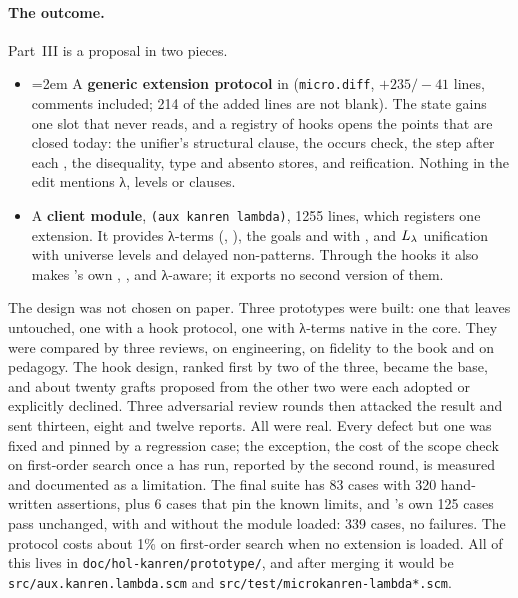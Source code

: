 \paragraph{The outcome.} Part~III is a proposal in two pieces.
\begin{itemize}[nosep]
  \item \emergencystretch=2em A \textbf{generic extension protocol} in \micro{} (\texttt{micro.diff}, $+235/{-}41$ lines,
        comments included; 214 of the added lines are not blank). The state gains one slot that \micro{} never reads, and a registry of hooks opens the
        points that are closed today: the unifier's structural clause, the occurs check, the step after each
        , the disequality, type and absento stores, and reification. Nothing in the edit mentions λ,
        levels or clauses.
  \item A \textbf{client module}, \texttt{(aux kanren lambda)}, 1255 lines, which registers one extension.
        It provides λ-terms (, ), the goals  and  with
        , and $L_\lambda$ unification with universe levels and delayed
        non-patterns. Through the hooks it also makes \micro's own , ,
         and  λ-aware; it exports no second version of them.
\end{itemize}
\noindent The design was not chosen on paper. Three prototypes were built: one that leaves \micro{}
untouched, one with a hook protocol, one with λ-terms native in the core. They were compared by three
reviews, on engineering, on fidelity to the book and on pedagogy. The hook design, ranked first by two of
the three, became the base, and about twenty grafts proposed from the other two were each adopted or
explicitly declined. Three adversarial review rounds
then attacked the result and sent thirteen, eight and twelve reports. All were real. Every defect but
one was fixed and pinned by a regression case; the
exception, the cost of the scope check on first-order search once a  has run, reported by the
second round, is measured and documented as a limitation. The final suite has
83 cases with 320 hand-written assertions, plus 6 cases that pin the known limits, and \micro's own 125
cases pass unchanged, with and without the module loaded: 339 cases, no failures. The protocol costs about
1\% on first-order search when no extension is loaded. All of this lives in
\texttt{doc/hol-kanren/prototype/}, and after merging it would be \texttt{src/aux.kanren.lambda.scm} and
\texttt{src/test/microkanren-lambda*.scm}.

